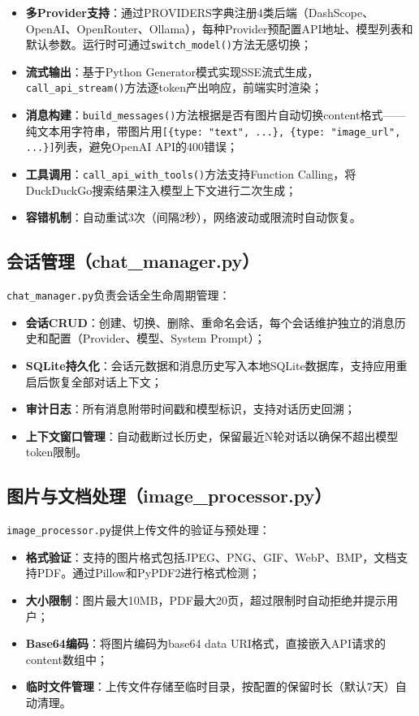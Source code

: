 \begin{itemize}
  \item \textbf{多Provider支持}：通过PROVIDERS字典注册4类后端（DashScope、OpenAI、OpenRouter、Ollama），每种Provider预配置API地址、模型列表和默认参数。运行时可通过\texttt{switch\_model()}方法无感切换；
  \item \textbf{流式输出}：基于Python Generator模式实现SSE流式生成，\texttt{call\_api\_stream()}方法逐token产出响应，前端实时渲染；
  \item \textbf{消息构建}：\texttt{build\_messages()}方法根据是否有图片自动切换content格式——纯文本用字符串，带图片用\texttt{[\{type: "text", ...\}, \{type: "image\_url", ...\}]}列表，避免OpenAI API的400错误；
  \item \textbf{工具调用}：\texttt{call\_api\_with\_tools()}方法支持Function Calling，将DuckDuckGo搜索结果注入模型上下文进行二次生成；
  \item \textbf{容错机制}：自动重试3次（间隔2秒），网络波动或限流时自动恢复。
\end{itemize}

\subsection{会话管理（chat\_manager.py）}

\texttt{chat\_manager.py}负责会话全生命周期管理：

\begin{itemize}
  \item \textbf{会话CRUD}：创建、切换、删除、重命名会话，每个会话维护独立的消息历史和配置（Provider、模型、System Prompt）；
  \item \textbf{SQLite持久化}：会话元数据和消息历史写入本地SQLite数据库，支持应用重启后恢复全部对话上下文；
  \item \textbf{审计日志}：所有消息附带时间戳和模型标识，支持对话历史回溯；
  \item \textbf{上下文窗口管理}：自动截断过长历史，保留最近N轮对话以确保不超出模型token限制。
\end{itemize}

\subsection{图片与文档处理（image\_processor.py）}

\texttt{image\_processor.py}提供上传文件的验证与预处理：

\begin{itemize}
  \item \textbf{格式验证}：支持的图片格式包括JPEG、PNG、GIF、WebP、BMP，文档支持PDF。通过Pillow和PyPDF2进行格式检测；
  \item \textbf{大小限制}：图片最大10MB，PDF最大20页，超过限制时自动拒绝并提示用户；
  \item \textbf{Base64编码}：将图片编码为base64 data URI格式，直接嵌入API请求的content数组中；
  \item \textbf{临时文件管理}：上传文件存储至临时目录，按配置的保留时长（默认7天）自动清理。
\end{itemize}

